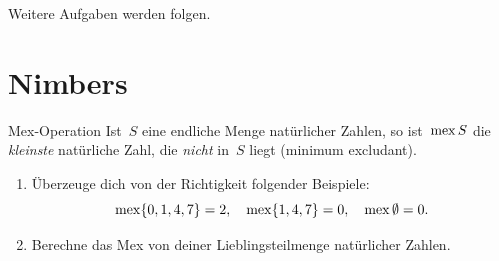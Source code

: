 \documentclass{zirkelblatt}
\newcommand{\head}[1]{\section*{\rmfamily #1}}%
\begin{document}
%

Weitere Aufgaben werden folgen.


\head{Nimbers}

\begin{aufgabe}{Mex-Operation}
\label{mex}
Ist~$S$ eine endliche Menge natürlicher Zahlen, so ist~$\operatorname{mex} S$ die \emph{kleinste}
natürliche Zahl, die \emph{nicht} in~$S$ liegt (minimum excludant).
\begin{enumerate}
\item Überzeuge dich von der Richtigkeit folgender Beispiele:
\[
  \operatorname{mex} \{ 0,1,4,7 \} = 2, \quad
  \operatorname{mex} \{ 1,4,7 \} = 0, \quad
  \operatorname{mex} \emptyset = 0. \]
\item Berechne das Mex von deiner Lieblingsteilmenge natürlicher Zahlen.
\end{enumerate}
\end{aufgabe}
\end{document}

